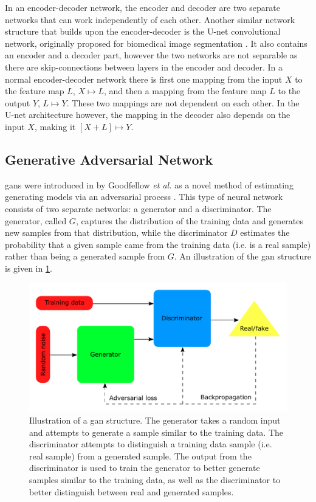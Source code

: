 In an encoder-decoder network, the encoder and decoder are two separate networks that can work independently of each other. Another similar network structure that builds upon the encoder-decoder is the U-net convolutional network, originally proposed for biomedical image segmentation \cite{unet}. It also contains an encoder and a decoder part, however the two networks are not separable as there are skip-connections between layers in the encoder and decoder. In a normal encoder-decoder network there is first one mapping from the input $X$ to the feature map $L$, $X \mapsto L$, and then a mapping from the feature map $L$ to the output $Y$, $L \mapsto Y$. These two mappings are not dependent on each other. In the U-net architecture however,  the mapping in the decoder also depends on the input $X$, making it $[X+L] \mapsto Y$. 


\subsection{Generative Adversarial Network}
\label{sec:ml:types:gan}
\gls{gan}s were introduced in \citeyear{goodfellow2014gan} by Goodfellow \textit{et al.} as a novel method of estimating generating models via an adversarial process \cite{goodfellow2014gan}. This type of neural network consists of two separate networks: a generator and a discriminator. The generator, called $G$, captures the distribution of the training data and generates new samples from that distribution, while the discriminator $D$ estimates the probability that a given sample came from the training data (i.e. is a real sample) rather than being a generated sample from $G$. An illustration of the \gls{gan} structure is given in \cref{fig:gan}. 

\begin{figure}[htbp]  
    \centering
    \includegraphics[width=.8\textwidth]{figures/gan.pdf}
    \caption[Illustration of a GAN structure]{Illustration of a \gls{gan} structure. The generator takes a random input and attempts to generate a sample similar to the training data. The discriminator attempts to distinguish a training data sample (i.e. real sample) from a generated sample. The output from the discriminator is used to train the generator to better generate samples similar to the training data, as well as the discriminator to better distinguish between real and generated samples. }
    \label{fig:gan}
\end{figure}

